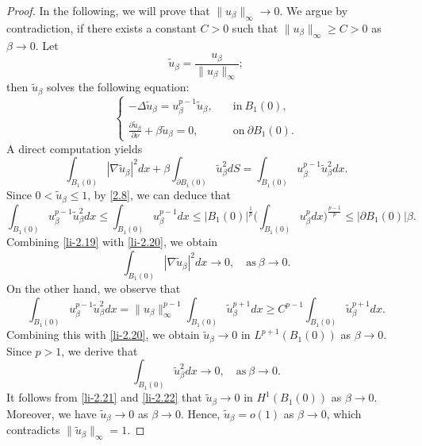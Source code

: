 \documentclass[10pt,a4paper]{amsart}
\begin{document}
\begin{proof}
In the following, we will prove that $\|u_\beta\|_\infty\to 0$. We argue by contradiction, if there exists a constant $C>0$ such that $\|u_\beta\|_\infty\geq C>0$ as $\beta\to 0$.
Let
$$
\tilde{u}_\beta=\frac{u_\beta}{\|u_\beta\|_\infty};
$$
then $\tilde{u}_\beta$ solves the following equation:
\begin{equation}
\begin{cases}
-\Delta \tilde{u}_\beta=u_\beta^{p-1}\tilde{u}_\beta,\quad &\text{in}\ B_1(0),\\
\frac{\partial \tilde{u}_\beta}{\partial \nu}+\beta \tilde{u}_\beta=0, &\text{on}\ \partial B_1(0).
\end{cases}
\end{equation}
A direct computation yields 
\begin{equation}\label{li-2.19}
\int_{B_1(0)}|\nabla \tilde{u}_\beta|^2dx+\beta\int_{\partial B_1(0)}\tilde{u}_\beta^2dS=\int_{B_1(0)}u_\beta^{p-1}\tilde{u}_\beta^2dx.
\end{equation}
Since $0<\tilde{u}_\beta\leq 1$, by  \eqref{2.8}, we can deduce that 
\begin{equation}\label{li-2.20}
\int_{B_1(0)}u_\beta^{p-1}\tilde{u}_\beta^2dx\leq \int_{B_1(0)}u_\beta^{p-1}dx\leq |B_1(0)|^{\frac{1}{p}}\Big(\int_{B_1(0)}u_\beta^{p}dx\Big)^{\frac{p-1}{p}}\leq |\partial B_1(0)|\beta.
\end{equation}
Combining \eqref{li-2.19} with \eqref{li-2.20}, we obtain
\begin{equation}\label{li-2.21}
\int_{B_1(0)}|\nabla \tilde{u}_\beta|^2dx\to 0,\quad \text{as}\ \beta\to 0.
\end{equation}
On the other hand, we observe that 
$$
\int_{B_1(0)}u_\beta^{p-1}\tilde{u}_\beta^2dx=\|u_\beta\|_\infty^{p-1}\int_{B_1(0)}\tilde{u}_\beta^{p+1}dx\geq C^{p-1}\int_{B_1(0)}\tilde{u}_\beta^{p+1}dx.
$$
Combining this with \eqref{li-2.20}, we obtain $\tilde{u}_\beta\to 0$ in $L^{p+1}(B_1(0))$ as $\beta\to 0$. Since $p>1$, we derive that 
\begin{equation}\label{li-2.22}
\int_{B_1(0)}\tilde{u}_\beta^2dx\to 0, \quad\text{as}\  \beta\to 0. 
\end{equation}
It follows from \eqref{li-2.21} and \eqref{li-2.22} that $\tilde{u}_\beta\to 0$ in $H^{1}(B_1(0))$ as $\beta\to 0$. Moreover, we have $\tilde{u}_\beta\to 0$ as $\beta\to 0$. Hence, $\tilde{u}_\beta=o(1)$ as $\beta\to 0$, which contradicts $\|\tilde{u}_\beta\|_\infty=1$.
\end{proof}
\end{document}
